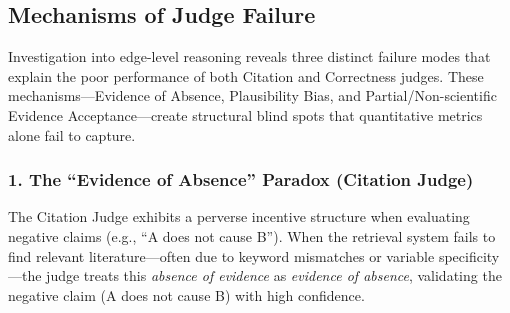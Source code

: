 

\subsection{Mechanisms of Judge Failure}
\label{sec:discussion_failure_mechanisms}

Investigation into edge-level reasoning reveals three distinct failure modes that explain the poor performance of both Citation and Correctness judges. These mechanisms—Evidence of Absence, Plausibility Bias, and Partial/Non-scientific Evidence Acceptance—create structural blind spots that quantitative metrics alone fail to capture.

\subsubsection{1. The ``Evidence of Absence'' Paradox (Citation Judge)}
The Citation Judge exhibits a perverse incentive structure when evaluating negative claims (e.g., ``A does not cause B''). When the retrieval system fails to find relevant literature—often due to keyword mismatches or variable specificity—the judge treats this \textit{absence of evidence} as \textit{evidence of absence}, validating the negative claim (A does not cause B) with high confidence.

